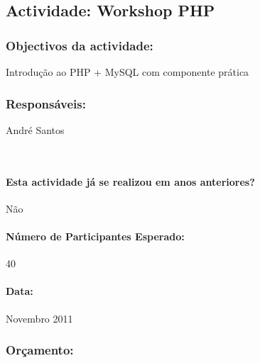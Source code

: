 \subsection{Actividade: Workshop PHP} %

\subsubsection*{Objectivos da actividade:}
Introdução ao PHP + MySQL com componente prática
~
\subsubsection*{Responsáveis:}
\begin{itemizedash}
	\item André Santos
\end{itemizedash}
~
\paragraph{Esta actividade já se realizou em anos anteriores?}
Não

\paragraph{Número de Participantes Esperado:}
40

\paragraph{Data:} Novembro 2011

\subsubsection*{Orçamento:}

\begin{center}

\end{center}


\vspace{20pt}
